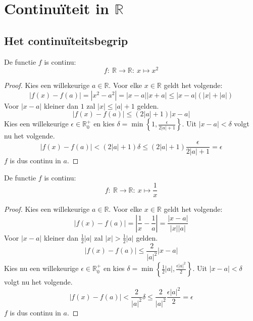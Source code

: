 \documentclass[main.tex]{subfiles}
\begin{document}
\section{Continu\"iteit in $\mathbb{R}$}

\subsection{Het continu\"iteitsbegrip}

\begin{vb}
  De functie $f$ is continu:
  \[ f:\ \mathbb{R} \rightarrow \mathbb{R}:\ x \mapsto x^{2} \]

  \begin{proof}
    Kies een willekeurige $a \in \mathbb{R}$.
    Voor elke $x\in \mathbb{R}$ geldt het volgende:
    \[ |f(x)-f(a)| = |x^{2}-a^{2}| = |x-a||x+a| \le |x-a|(|x|+|a|) \]
    Voor $|x-a|$ kleiner dan $1$ zal $|x| \le |a|+1$ gelden.
    \[ |f(x)-f(a)| \le (2|a|+1)|x-a| \]
    Kies een willekeurige $\epsilon \in \mathbb{R}_{0}^{+}$ en kies $\delta = \min\left\{ 1, \frac{\epsilon}{2|a|+1} \right\}$.
    Uit $|x-a|< \delta$ volgt nu het volgende.
    \[ |f(x)-f(a)| < (2|a|+1)\delta \le (2|a|+1)\frac{\epsilon}{2|a|+1} = \epsilon \]
    $f$ is dus continu in $a$.
  \end{proof}
\end{vb}

\begin{vb}
  De functie $f$ is continu:
  \[ f:\ \mathbb{R} \rightarrow \mathbb{R}:\ x \mapsto \frac{1}{x} \]
  
  \begin{proof}
    Kies een willekeurige $a \in \mathbb{R}$.
    Voor elke $x \in \mathbb{R}$ geldt het volgende:
    \[ |f(x)-f(a)| = \left|\frac{1}{x}-\frac{1}{a}\right| = \frac{|x-a|}{|x||a|} \]
    Voor $|x-a|$ kleiner dan $\frac{1}{2}|a|$ zal $|x| > \frac{1}{2}|a|$ gelden.
    \[ |f(x)-f(a)| \le \frac{2}{|a|^{2}}|x-a| \]
    Kies nu een willekeurige $\epsilon \in \mathbb{R}_{0}^{+}$ en kies $\delta = \min\left\{ \frac{1}{2}|a|, \frac{\epsilon|a|^{2}}{2} \right\}$.
    Uit $|x-a|< \delta$ volgt nu het volgende.
    \[ |f(x)-f(a)| < \frac{2}{|a|^{2}}\delta \le \frac{2}{|a|^{2}}\frac{\epsilon|a|^{2}}{2} = \epsilon \]
    $f$ is dus continu in $a$.
  \end{proof}
\end{vb}
\end{document}
